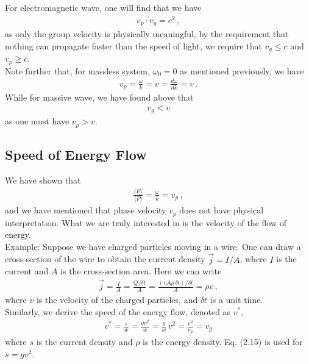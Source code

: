 \documentclass[11pt, onesided]{book}
\theoremstyle{break}
\theoremstyle{break}
\newcommand{\example}{\color{green}Example: \color{black}}
\begin{document}
For electromagnetic wave, one will find that we have
\begin{align*}
v_p \cdot v_g = c^2\,,
\end{align*}
as only the group velocity is physically meaningful, by the requirement that nothing can propagate faster than the speed of light, we require that $v_g\leq c$ and $v_p \geq c$. \\

Note further that, for massless system, $\omega_0 = 0$ as mentioned previously, we have
\begin{align*}
v_p = \frac{\omega}{k} = v= \frac{d\omega}{dk} = v\,.
\end{align*}
While for massive wave, we have found above that
\begin{align*}
v_g < v
\end{align*}
as one must have $v_p > v$. \\

\subsection{Speed of Energy Flow}
We have shown that
\begin{align*}
\frac{\langle E\rangle}{\langle P\rangle} = \frac{\omega}{k} = v_p\,,
\end{align*}
and we have mentioned that phase velocity $v_p$ does not have physical interpretation. What we are truly interested in is the velocity of the flow of energy.\\

\example Suppose we have charged particles moving in a wire. One can draw a cross-section of the wire to obtain the current density $\vec{j} = I/A$, where $I$ is the current and $A$ is the cross-section area. Here we can write
\begin{align*}
\vec{j} = \frac{I}{A} = \frac{Q/\delta t}{A} = \frac{(v A\rho\,\delta t)/\delta t}{A} = \rho v\,,
\end{align*}
where $v$ is the velocity of the charged particles, and $\delta t$ is a unit time.\\

Similarly, we derive the speed of the energy flow, denoted as $v^*$,
\begin{align*}
v^* = \frac{s}{w} = \frac{g v^2}{w} = \frac{g}{w}\, v^2 = \frac{v^2}{v_p} = v_g
\end{align*} 
where $s$ is the current density and $\rho$ is the energy density. Eq. (2.15) is used for $s = gv^2$. 
\end{document}
